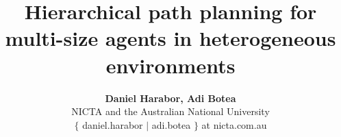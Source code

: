 \documentclass[conference]{IEEEtran}
\begin{document}
\title{Hierarchical path planning for multi-size agents in heterogeneous environments}
\author{\textbf{Daniel Harabor, Adi Botea} \\ NICTA and the Australian National University \\ $\lbrace$ daniel.harabor $|$ adi.botea $\rbrace$ at nicta.com.au}

\maketitle









 









%
%
%
%
\end{document}
